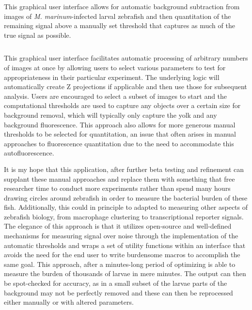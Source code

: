\begin{code}
\caption{This graphical user interface allows for automatic background subtraction from images of \textit{M. marinum}-infected larval zebrafish and then quantitation of the remaining signal above a manually set threshold that captures as much of the true signal as possible.}
\label{burden}

\inputminted[breaklines,frame=single,fontsize=\small]{python}{source/burdenMeasurer.py}

\end{code}

This graphical user interface facilitates automatic processing of arbitrary numbers of images at once by allowing users to select various parameters to test for appropriateness in their particular experiment. The underlying logic will automatically create Z projections if applicable and then use those for subsequent analysis. Users are encouraged to select a subset of images to start and the computational thresholds are used to capture any objects over a certain size for background removal, which will typically only capture the yolk and any background fluorescence. This approach also allows for more generous manual thresholds to be selected for quantitation, an issue that often arises in manual approaches to fluorescence quantitation due to the need to accommodate this autofluorescence. 

It is my hope that this application, after further beta testing and refinement can supplant these manual approaches and replace them with something that free researcher time to conduct more experiments rather than spend many hours drawing circles around zebrafish in order to measure the bacterial burden of these fish. Additionally, this could in principle to adapted to measuring other aspects of zebrafish biology, from macrophage clustering to transcriptional reporter signals. The elegance of this approach is that it utilizes open-source and well-defined mechanisms for measuring signal over noise through the implementation of the automatic thresholds and wraps a set of utility functions within an interface that avoids the need for the end user to write burdensome macros to accomplish the same goal. This approach, after a minutes-long period of optimizing is able to measure the burden of thousands of larvae in mere minutes. The output can then be spot-checked for accuracy, as in a small subset of the larvae parts of the background may not be perfectly removed and these can then be reprocessed either manually or with altered parameters. 


